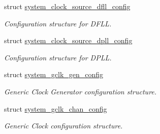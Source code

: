 \begin{DoxyCompactItemize}
struct \hyperlink{structsystem__clock__source__dfll__config}{system\+\_\+clock\+\_\+source\+\_\+dfll\+\_\+config}
\begin{DoxyCompactList}\small\item\em Configuration structure for D\+F\+L\+L. \end{DoxyCompactList}\item 
struct \hyperlink{structsystem__clock__source__dpll__config}{system\+\_\+clock\+\_\+source\+\_\+dpll\+\_\+config}
\begin{DoxyCompactList}\small\item\em Configuration structure for D\+P\+L\+L. \end{DoxyCompactList}\item 
struct \hyperlink{structsystem__gclk__gen__config}{system\+\_\+gclk\+\_\+gen\+\_\+config}
\begin{DoxyCompactList}\small\item\em Generic Clock Generator configuration structure. \end{DoxyCompactList}\item 
struct \hyperlink{structsystem__gclk__chan__config}{system\+\_\+gclk\+\_\+chan\+\_\+config}
\begin{DoxyCompactList}\small\item\em Generic Clock configuration structure. \end{DoxyCompactList}\end{DoxyCompactItemize}
